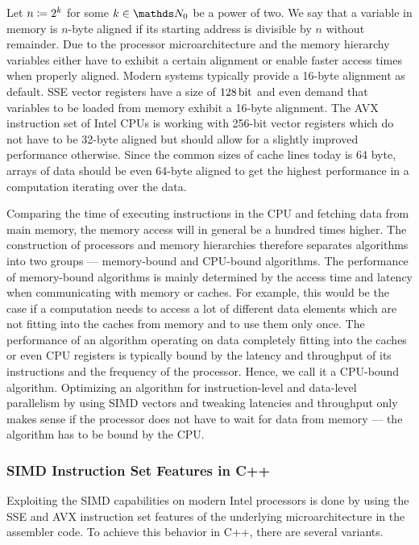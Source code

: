 \documentclass{stdlocal}
\begin{document}
    Let $n \coloneqq 2^k$ for some $k\in\setNatural_0$ be a power of two.
    We say that a variable in memory is $n$-byte aligned if its starting address is divisible by $n$ without remainder.
    Due to the processor microarchitecture and the memory hierarchy variables either have to exhibit a certain alignment or enable faster access times when properly aligned.
    Modern systems typically provide a 16-byte alignment as default.
    SSE vector registers have a size of $128\, \mathrm{bit}$ and even demand that variables to be loaded from memory exhibit a 16-byte alignment.
    The AVX instruction set of Intel CPUs is working with 256-bit vector registers which do not have to be 32-byte aligned but should allow for a slightly improved performance otherwise.
    Since the common sizes of cache lines today is 64 byte, arrays of data should be even 64-byte aligned to get the highest performance in a computation iterating over the data.
    \autocite{fog2019a}

    Comparing the time of executing instructions in the CPU and fetching data from main memory, the memory access will in general be a hundred times higher.
    The construction of processors and memory hierarchies therefore separates algorithms into two groups --- memory-bound and CPU-bound algorithms.
    The performance of memory-bound algorithms is mainly determined by the access time and latency when communicating with memory or caches.
    For example, this would be the case if a computation needs to access a lot of different data elements which are not fitting into the caches from memory and to use them only once.
    The performance of an algorithm operating on data completely fitting into the caches or even CPU registers is typically bound by the latency and throughput of its instructions and the frequency of the processor.
    Hence, we call it a CPU-bound algorithm.
    Optimizing an algorithm for instruction-level and data-level parallelism by using SIMD vectors and tweaking latencies and throughput only makes sense if the processor does not have to wait for data from memory --- the algorithm has to be bound by the CPU.
    \autocite{patterson2014,hennessy2019}

  \subsubsection*{SIMD Instruction Set Features in C++} %
  \label{sub:usage_in_c_}
    Exploiting the SIMD capabilities on modern Intel processors is done by using the SSE and AVX instruction set features of the underlying microarchitecture in the assembler code.
    To achieve this behavior in C++, there are several variants.
\end{document}
